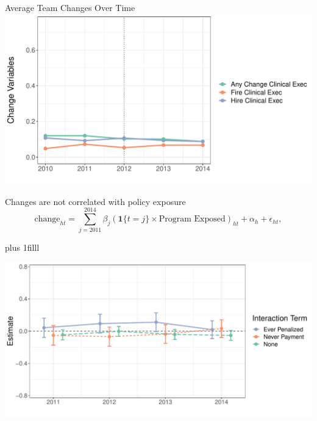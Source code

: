 \documentclass[notes,11pt, aspectratio=169]{beamer}
\newcommand{\btVFill}{\vskip0pt plus 1filll}
\begin{document}
\begin{frame}{Average Team Changes Over Time}
\centering 
    \includegraphics[width=.8\textwidth]{Objects/change_means.pdf}
\end{frame}

\begin{frame}{Changes are not correlated with policy exposure}
\centering \small
\begin{equation*}\label{eq:change2}
    \text{change}_{ht} = \sum_{j=2011}^{2014}\beta_j(\mathbf{1}\{t=j\}\times \text{Program Exposed})_{ht} + \alpha_h + \epsilon_{ht},
    \end{equation*}

    \btVFill

    \includegraphics[width=.6\textwidth]{Objects/change_analysis_plot.pdf}
    
\end{frame}
\end{document}
